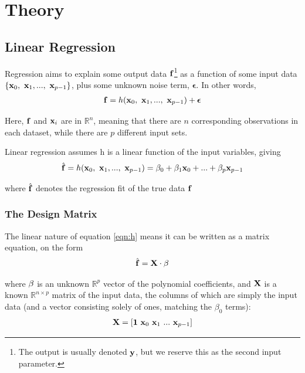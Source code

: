 \documentclass[10pt, twocolumn]{article}
\renewcommand{\b}{\boldsymbol}
\begin{document}
\section{Theory}

\subsection{Linear Regression}
Regression aims to explain some output data $\vb{f}$\footnote{The output is usually denoted $\vb{y}$, but we reserve this as the second input parameter.} as a function of some input data $\{\vb{x}_0,\ \vb{x}_1, ...,\ \vb{x}_{p-1}\}$, plus some unknown noise term, $\b \epsilon$. In other words,
\begin{align}
    \vb{f} = h(\vb{x}_0,\ \vb{x}_1, ...,\ \vb{x}_{p-1}) + \b \epsilon
\end{align}

Here, $\vb{f}$ and $\vb{x}_i$ are in $\mathbb{R}^n$, meaning that there are $n$ corresponding observations in each dataset, while there are $p$ different input sets.

Linear regression assumes h is a linear function of the input variables, giving
\begin{align}\label{eqn:h}
    \hat{\vb{f}} = h(\vb{x}_0,\ \vb{x}_1, ...,\ \vb{x}_{p-1}) = \beta_0 + \beta_1\vb{x}_0 + ... + \beta_{p}\vb{x}_{p-1}
\end{align}

where $\hat{\vb{f}}$ denotes the regression fit of the true data $\vb{f}$


\subsubsection{The Design Matrix}
\label{subsubsec:Theory/Design-matrix}
The linear nature of equation \cref{eqn:h} means it can be written as a matrix equation, on the form
\begin{align}\label{eqn:fx=b}
    \hat{\vb{f}} = \vb{X} \cdot \vb{\beta}
\end{align}

where $\vb{\beta}$ is an unknown $\mathbb R^p$ vector of the polynomial coefficients, and $\vb{X}$ is a known $\mathbb R^{n\times p}$ matrix of the input data, the columns of which are simply the input data (and a vector consisting solely of ones, matching the $\beta_0$ terms):
\begin{align}
    \vb{X} = [\b 1\ \vb{x}_0\ \vb{x}_1\ ...\ \vb{x}_{p-1}]
\end{align}
\end{document}
